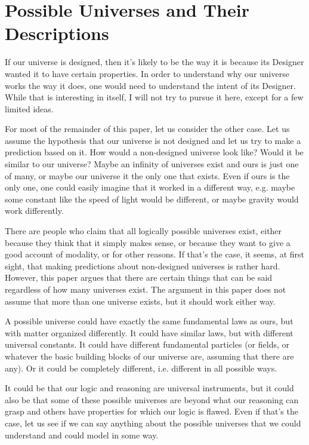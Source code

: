 \documentclass[a4paper
,draft
]{article}
\newcommand{\paper}[1]{paper}
\newcommand{\ghilimele}[1]{``#1"}
\begin{document}

\section{Possible Universes and Their Descriptions}
\label{sec:possible-universes}

If our universe is designed, then it's likely to be the way it is because
its Designer wanted it to have certain properties.
In order to understand why our universe works the way it does,
one would need to understand the intent of its Designer.
While that is interesting in itself, I will not try to pursue it here,
except for a few limited ideas.

For most of the remainder of this \paper{}, let us consider the other case.
Let us assume the hypothesis that our universe is not designed
and let us try to make a prediction based on it.
How would a non-designed universe look like?
Would it be similar to our universe?
Maybe an infinity of universes exist and ours is just one of many,
or maybe our universe it the only one that exists.
Even if ours is the only one, one could easily imagine that it worked
in a different way, e.g. maybe some constant like the speed of light would be
different, or maybe gravity would work differently.

There are people who claim that all logically possible universes exist,
either because they think that it simply makes sense, or because they want to
give a good account of modality, or for other reasons.
If that's the case, it seems, at first sight, that making predictions about
non-designed universes is rather hard.
However, this paper argues that there are certain things that can be said
regardless of how many universes exist.
The argument in this \paper{} does not assume that more than
one universe exists, but it should work either way.

A possible universe
could have exactly the same fundamental laws as ours, but with matter
organized differently.
It could have similar laws, but with different universal constants.
It could have different fundamental particles (or fields, or whatever the basic
building blocks of our universe are, assuming that there are any).
Or it could be completely different, i.e. different in all possible ways.

It could be that our logic and reasoning are universal instruments,
but it could also be that some of these possible universes are
beyond what our reasoning can grasp and others have properties
for which our logic is flawed.
Even if that's the case, let us see if we can say anything about
the possible universes that we could understand and could model in some way.
\end{document}
